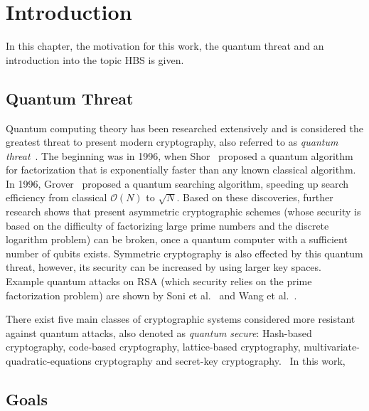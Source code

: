 \chapter{Introduction}
\label{cha:introduction}
In this chapter, the motivation for this work, the quantum threat and an introduction into the topic HBS is given.

\section{Quantum Threat}
Quantum computing theory has been researched extensively and is considered the greatest threat to present modern cryptography, also referred to as \textit{quantum threat}~\cite{impact_quantum_crypto_2018}.
The beginning was in 1996, when Shor~\cite{shors_algo_original_1999} proposed a quantum algorithm for factorization that is exponentially faster than any known classical algorithm. In 1996, Grover~\cite{grovers_algo_basispaper_1997} proposed a quantum searching algorithm, speeding up search efficiency from classical $\mathcal{O}(N)$ to $\sqrt{N}$. 
Based on these discoveries, further research shows that present asymmetric cryptographic schemes (whose security is based on the difficulty of factorizing large prime numbers and the discrete logarithm problem) can be broken, once a quantum computer with a sufficient number of qubits exists. 
Symmetric cryptography is also effected by this quantum threat, however, its security can be increased by using larger key spaces.
~\cite{impact_quantum_crypto_2018} %
Example quantum attacks on RSA (which security relies on the prime factorization problem) are shown by Soni et al.~\cite{RSA_pq-attack_examples_2018} and Wang et al.~\cite{RSA_pq-attack_without_factorization_2018}.


There exist five main classes of cryptographic systems considered more resistant against quantum attacks, also denoted as \textit{quantum secure}: Hash-based cryptography, code-based cryptography, lattice-based cryptography, multivariate-quadratic-equations cryptography and secret-key cryptography.~\cite{book_pqc_bernstein_2004}
In this work, 

\section{Goals} 


